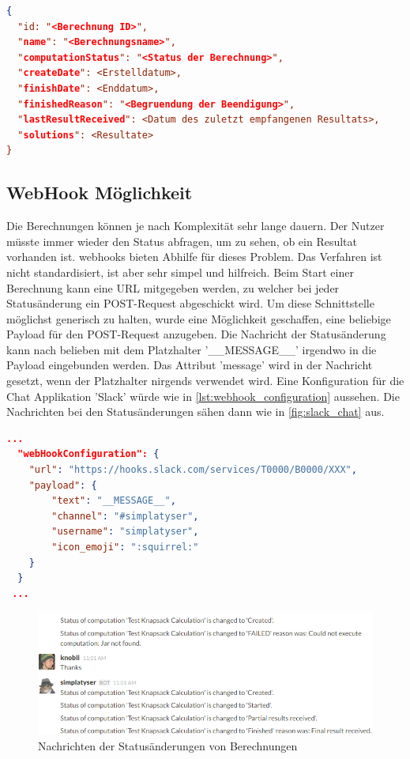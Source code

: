 \begin{lstlisting}[language=JSON, caption=Aufbau einer Antwort auf eine Statusabfrage, label=lst:status_response]  
{
  "id: "<Berechnung ID>",
  "name": "<Berechnungsname>",
  "computationStatus": "<Status der Berechnung>",
  "createDate": <Erstelldatum>,
  "finishDate": <Enddatum>,
  "finishedReason": "<Begruendung der Beendigung>",
  "lastResultReceived": <Datum des zuletzt empfangenen Resultats>,
  "solutions": <Resultate>
}
\end{lstlisting}

\subsection{WebHook Möglichkeit}
Die Berechnungen können je nach Komplexität sehr lange dauern. Der Nutzer müsste immer wieder den Status abfragen, um zu sehen, ob ein Resultat vorhanden ist. \glspl{webhook} 
bieten Abhilfe für dieses Problem. Das Verfahren ist nicht standardisiert, ist aber sehr simpel und hilfreich. Beim Start einer Berechnung kann eine URL mitgegeben werden, zu welcher 
bei jeder Statusänderung ein POST-Request abgeschickt wird. Um diese Schnittstelle möglichst generisch zu halten, wurde eine Möglichkeit geschaffen, eine beliebige Payload für den 
POST-Request anzugeben. Die Nachricht der Statusänderung kann nach belieben mit dem Platzhalter '\_\_MESSAGE\_\_' irgendwo in die Payload eingebunden werden. Das Attribut 'message' 
wird in der Nachricht gesetzt, wenn der Platzhalter nirgends verwendet wird. Eine Konfiguration für die Chat Applikation 'Slack' würde wie in \autoref{lst:webhook_configuration} 
aussehen. Die Nachrichten bei den Statusänderungen sähen dann wie in \autoref{fig:slack_chat} aus.

\begin{lstlisting}[language=JSON, caption=Beispiel einer WebHook Konfiguration für Slack, label=lst:webhook_configuration]
  ...  
  "webHookConfiguration": {
    "url": "https://hooks.slack.com/services/T0000/B0000/XXX",
    "payload": {
        "text": "__MESSAGE__",
        "channel": "#simplatyser",
        "username": "simplatyser",
        "icon_emoji": ":squirrel:"
    }
  }
 ...
\end{lstlisting}

\begin{figure}[h]
\centering
\includegraphics[scale=0.8]{images/slack_chat.png}
\caption[Nachrichten der Statusänderungen von Berechnungen]{Nachrichten der Statusänderungen von Berechnungen \selfmade{}}
\label{fig:slack_chat}
\end{figure}

